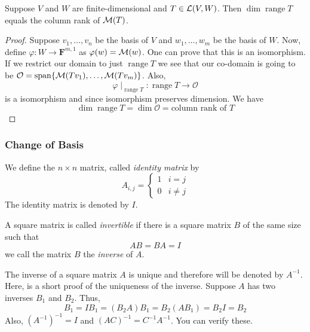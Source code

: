 \begin{proposition}
    Suppose $V$ and $W$ are finite-dimensional and $T \in \operatorname{\mathcal{L}}(V,W)$. Then $\dim \operatorname{range} T$ equals the column rank of 
    $\operatorname{\mathcal{M}}(T)$.
\end{proposition}

\begin{proof}
    Suppose $v_1, \ldots, v_n$ be the basis of $V$ and $w_1, \ldots, w_m$ be the basis of $W$. Now, define 
    $\varphi : W \to \mathbf{F}^{m,1}$ as $\varphi(w)=\operatorname{\mathcal{M}}(w)$. One can prove that this is an isomorphism. If we restrict our domain to just
    $\operatorname{range} T$ we see that our co-domain is going to be $\mathcal{O}=\operatorname{span}\{\operatorname{\mathcal{M}}(Tv_1),\ldots,\operatorname{\mathcal{M}}(Tv_m)\}$. Also,
    \[ \varphi \mid_{\operatorname{range} T} : \operatorname{range} T \to \mathcal{O} \] 
    is a isomorphism and since isomorphism preserves dimension. We have
    \[ \dim \operatorname{range} T = \dim \mathcal{O} = \text{column rank of } T \]
\end{proof}

\subsubsection{Change of Basis}

\begin{definition}
    We define the $n \times n$ matrix, called \textit{identity matrix}
    by
    \[ A_{i,j} = \begin{cases}
        1 & i = j \\
        0 & i \neq j
    \end{cases} \]
    The identity matrix is denoted by $I$.
\end{definition}

\begin{definition}
    A square matrix is called \textit{invertible} if there is a square matrix $B$ of the same size such that
    \[ AB = BA = I \]
    we call the matrix $B$ the \textit{inverse} of $A$.
\end{definition}

\begin{remark}
    The inverse of a square matrix $A$ is unique and therefore will be denoted by $A^{-1}$. Here, is a short proof of the uniqueness of the 
    inverse. Suppose $A$ has two inverses $B_1 $ and $B_2$. Thus, 
    \[ B_1 = I B_1 = (B_2A)B_1 = B_2 (AB_1) = B_2I = B_2  \]
    Also, $(A^{-1})^{-1}=I$ and $(AC)^{-1}=C^{-1}A^{-1}$. You can verify these.
\end{remark}

